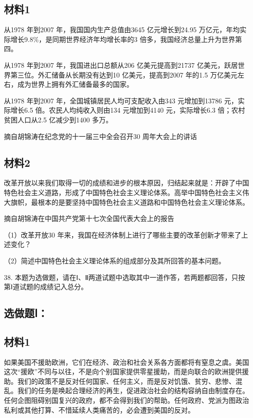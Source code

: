\documentclass[UTF8,11pt]{ctexart}
\begin{document}
\subsection*{材料1}

从1978 年到2007 年，我国国内生产总值由3645 亿元增长到24.95 万亿元，年均实际增长9.8\%，是同期世界经济年均增长率的3 倍多，我国经济总量上升为世界第四。

从1978 年到2007 年，我国进出口总额从206 亿美元提高到21737 亿美元，跃居世界第三位。外汇储备从长期没有达到10 亿美元，提高到2007 年的1.5 万亿美元左右，成为世界上拥有外汇储备最多的国家。

从1978 年到2007 年，全国城镇居民人均可支配收入由343 元增加到13786 元，实际增长6.5 倍。农民人均纯收入则由134 元增加到4140 元，实际增长6.3 倍；农村贫困人口从2.5 亿减少到1400 多万。

摘自胡锦涛在纪念党的十一届三中全会召开30 周年大会上的讲话

\subsection*{材料2}

改革开放以来我们取得一切的成绩和进步的根本原因，归结起来就是：开辟了中国特色社会主义道路，形成了中国特色社会主义理论体系。高举中国特色社会主义伟大旗帜，最根本的是要坚持中国特色社会主义道路和中国特色社会主义理论体系。

摘自胡锦涛在中国共产党第十七次全国代表大会上的报告

（1）改革开放30 年来，我国在经济体制上进行了哪些主要的改革创新才带来了上述变化？


（2）简述中国特色社会主义理论体系的组成部分及其所回答的基本问题。


38. 本题为选做题，请在Ⅰ、Ⅱ两道试题中选取其中一道作答，若两题都回答，只按第Ⅰ道试题的成绩记入总分。


\subsection*{选做题Ⅰ：}

\subsection*{材料1}

如果美国不援助欧洲，它们在经济、政治和社会关系各方面都将有窒息之虞。美国这次“援欧”不同与以往，不是向个别国家提供零星援助，而是向联合的欧洲提供援助。我们的政策不是反对任何国家、任何主义，而是反对饥饿、贫穷、悲惨、混乱。我们的任务是唤起合理经济的再生，促进政治社会的结构容纳自由制度存在。任何企图阻碍别国复兴的政府，都不会得到我们的帮助。任何政府、党派为图政治私利或其他打算、不惜延续人类痛苦的，必会遭到美国的反对。
\end{document}
